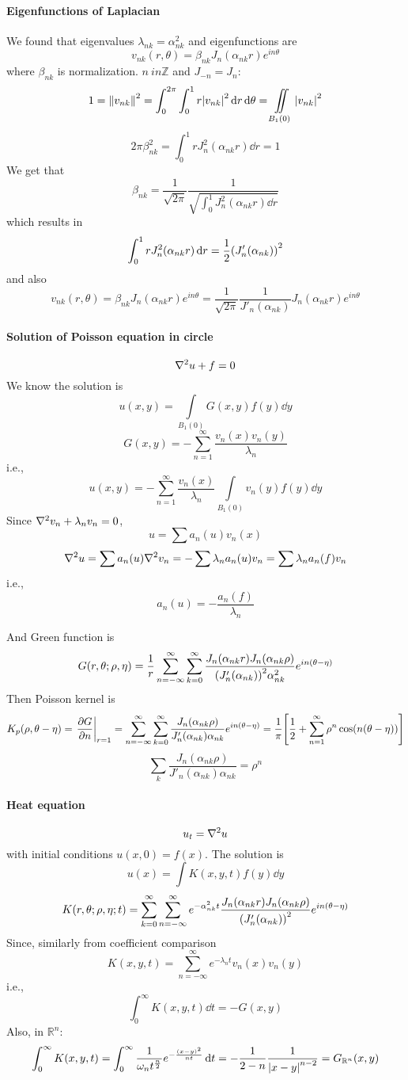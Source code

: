 \paragraph{Eigenfunctions of Laplacian}
We found that eigenvalues $\lambda_{nk} = \alpha_{nk}^2$ and eigenfunctions are
$$v_{nk}(r,\theta) = \beta_{nk} J_n(\alpha_{nk} r) e^{in\theta}$$
where $\beta_{nk}$ is normalization. $n\ in \mathbb{Z}$ and $J_{-n} = J_n$:
$$1 = \norm{v_{nk}}^2 = \int_0^{2\pi} \int_0^1 r \abs{v_{nk}}^2 \dd{r}\dd{\theta} = \iint\limits_{B_1(0)} \abs{v_{nk}}^2$$
$$2\pi \beta^2_{nk} = \int_0^1 r J_n^2(\alpha_{nk} r)\dd{r} = 1$$
We get that
$$\beta_{nk} = \frac{1}{\sqrt{2\pi} } \frac{1}{\sqrt{\int_0^1 J_n^2(\alpha_{nk} r) \dd{r}}}$$
which results in
$$\int_0^1 r J_n^2 (\alpha_{nk} r) \dd{r} = \frac{1}{2} \qty(J'_n(\alpha_{nk}))^2$$ 
and also
$$v_{nk}(r,\theta) = \beta_{nk} J_n(\alpha_{nk} r) e^{in\theta}= \frac{1}{\sqrt{2\pi} } \frac{1}{J'_n(\alpha_{nk})} J_n(\alpha_{nk} r) e^{in\theta}$$

\paragraph{Solution of Poisson equation in circle}
$$\laplacian{u} + f = 0$$
We know the solution is
$$u(x,y) = \int\limits_{B_1(0)} G(x,y) f(y) \dd{y}$$
$$G(x,y) = -\sum_{n=1}^\infty \frac{v_n(x)v_n(y)}{\lambda_n}$$
i.e.,
$$u(x,y) = -\sum_{n=1}^\infty\frac{v_n(x)}{\lambda_n} \int\limits_{B_1(0)} v_n(y) f(y) \dd{y} $$
Since $\laplacian{v_n} + \lambda_nv_n = 0$,
$$u = \sum a_n(u) v_n(x)$$
$$\laplacian u = \sum a_n(u) \laplacian{v_n} = -\sum \lambda_n a_n(u) v_n = \sum \lambda_n a_n(f) v_n $$
i.e.,
$$a_n(u) = -\frac{a_n(f)}{\lambda_n}$$

And Green function is
$$G(r,\theta ; \rho, \eta) = \frac{1}{r} \sum_{n=-\infty}^\infty \sum_{k=0}^\infty \frac{J_n(\alpha_{nk}r)J_n(\alpha_{nk}\rho)}{\qty(J'_n(\alpha_{nk}))^2 \alpha_{nk}^2} e^{in(\theta-\eta)}$$
Then Poisson kernel is
$$K_p(\rho, \theta-\eta) = \eval{\pdv{G}{n}}_{r=1} =  \sum_{n=-\infty}^\infty \sum_{k=0}^\infty \frac{J_n(\alpha_{nk}\rho)}{J'_n(\alpha_{nk})\alpha_{nk}} e^{in(\theta-\eta)}=\frac{1}{\pi} \qty[\frac{1}{2} + \sum_{n=1}^\infty \rho^n \cos(n(\theta-\eta))]$$
$$\sum_k \frac{J_n(\alpha_{nk}\rho)}{J'_n(\alpha_{nk}) \alpha_{nk}} = \rho^n$$

\paragraph{Heat equation}
$$u_t = \laplacian{u}$$
with initial conditions $u(x,0) = f(x)$. The solution is
$$u(x) = \int K(x,y,t) f(y) \dd{y}$$
$$K(r,\theta; \rho, \eta ; t) = \sum_{k=0}^\infty \sum_{n=-\infty}^\infty  e^{-\alpha_{nk}^2 t} \frac{J_n(\alpha_{nk}r)J_n(\alpha_{nk}\rho)}{\qty(J'_n(\alpha_{nk}))^2 } e^{in(\theta-\eta)}$$
Since, similarly from coefficient comparison
$$K(x,y,t) = \sum_{n=-\infty}^\infty e^{-\lambda_n t} v_n(x)v_n(y)$$
i.e.,
$$\int_0^\infty K(x,y,t) \dd{t} = -G(x,y)$$
Also, in $\mathbb{R}^n$:
$$\int_0^\infty K(x,y,t) = \int_0^\infty \frac{1}{\omega_n t^{\frac{n}{2}}} e^{-\frac{(x-y)^2}{nt}} \dd{t} = -\frac{1}{2-n} \frac{1}{\abs{x-y}^{n-2}} = G_{\mathbb{R}^n} (x,y)$$
